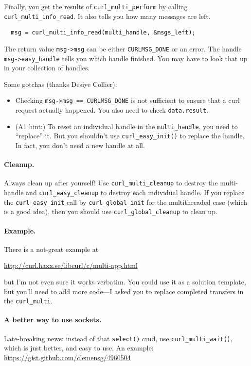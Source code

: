 Finally, you get the results of {\tt curl\_multi\_perform} by calling
{\tt curl\_multi\_info\_read}. It also tells you how many messages are left.
\begin{verbatim}
  msg = curl_multi_info_read(multi_handle, &msgs_left);
\end{verbatim}
The return value \verb+msg->msg+ can be either {\tt CURLMSG\_DONE} or an error.
The handle \verb+msg->easy_handle+ tells you which handle finished. You may have
to look that up in your collection of handles.

Some gotchas (thanks Desiye Collier):
\begin{itemize}
\item Checking \verb+msg->msg == CURLMSG_DONE+ is not sufficient to ensure that a curl request actually happened. You also need to check {\tt data.result}.
\item (A1 hint:) To reset an individual handle in the {\tt multi\_handle}, you need to ``replace'' it. But you shouldn't use {\tt curl\_easy\_init()} to replace the handle.  In fact, you don't need a new handle at all.
\end{itemize}

\paragraph{Cleanup.} Always clean up after yourself! Use {\tt curl\_multi\_cleanup}
to destroy the multi-handle and {\tt curl\_easy\_cleanup} to destroy each individual handle. If you replace the {\tt curl\_easy\_init} call by {\tt curl\_global\_init} for the multithreaded case (which is a good idea), then you should use {\tt curl\_global\_cleanup} to clean up.

\paragraph{Example.}
There is a not-great example at 
\begin{center}
\url{http://curl.haxx.se/libcurl/c/multi-app.html}
\end{center}
but I'm not even sure it works verbatim. You could use it as a solution template,
but you'll need to add more code---I asked you to replace completed transfers in the
{\tt curl\_multi}.

\paragraph{A better way to use sockets.} Late-breaking news: instead
of that {\tt select()} crud, use {\tt curl\_multi\_wait()}, which is
just better, and easy to use. An example:
\url{https://gist.github.com/clemensg/4960504}

